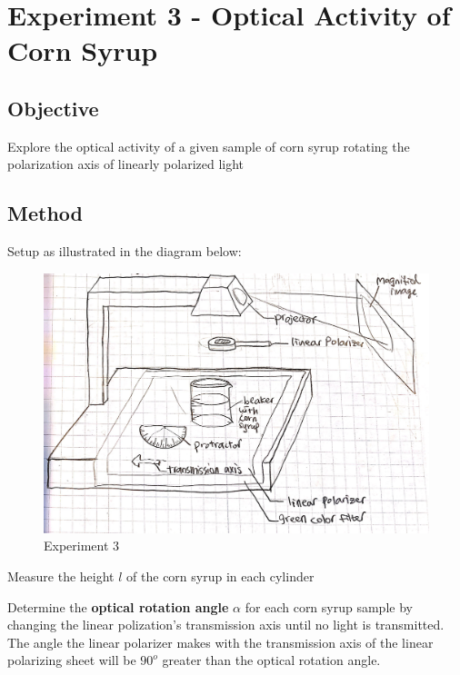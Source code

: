 \documentclass[11pt]{article}
\makeatletter
\def\maxwidth{\ifdim\Gin@nat@width>\linewidth\linewidth
    \else\Gin@nat@width\fi}
\let\Oldincludegraphics\includegraphics
\renewcommand{\includegraphics}[1]{\Oldincludegraphics[width=.8\maxwidth]{#1}}
\makeatother
\begin{document}
    \hypertarget{experiment-3---optical-activity-of-corn-syrup}{%
\section{Experiment 3 - Optical Activity of Corn
Syrup}\label{experiment-3---optical-activity-of-corn-syrup}}

\hypertarget{objective}{%
\subsection{Objective}\label{objective}}

Explore the optical activity of a given sample of corn syrup rotating
the polarization axis of linearly polarized light

\hypertarget{method}{%
\subsection{Method}\label{method}}

Setup as illustrated in the diagram below:

\begin{figure}
\centering
\includegraphics{fig1.jpg}
\caption{Experiment 3}
\end{figure}

Measure the height \(l\) of the corn syrup in each cylinder

Determine the \textbf{optical rotation angle} \(\alpha\) for each corn syrup sample by changing the linear polization's transmission axis until no light is transmitted.  The angle the linear polarizer makes with the transmission axis of the linear polarizing sheet will be $90^o$ greater than the optical rotation angle.
\end{document}
